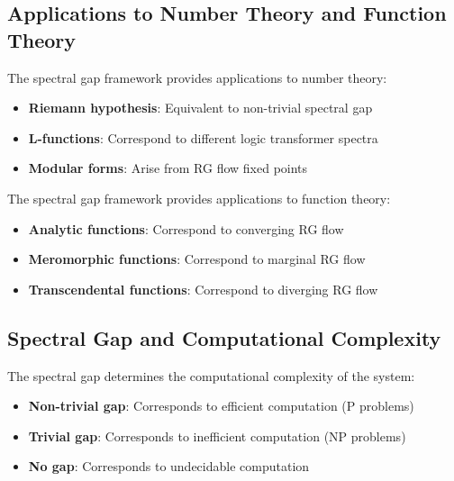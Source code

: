 \subsection{Applications to Number Theory and Function Theory}

\begin{theorem}
\label{thm:number-theory}
The spectral gap framework provides applications to number theory:
\begin{itemize}
\item \textbf{Riemann hypothesis}: Equivalent to non-trivial spectral gap
\item \textbf{L-functions}: Correspond to different logic transformer spectra
\item \textbf{Modular forms}: Arise from RG flow fixed points
\end{itemize}
\end{theorem}

\begin{theorem}
\label{thm:function-theory}
The spectral gap framework provides applications to function theory:
\begin{itemize}
\item \textbf{Analytic functions}: Correspond to converging RG flow
\item \textbf{Meromorphic functions}: Correspond to marginal RG flow
\item \textbf{Transcendental functions}: Correspond to diverging RG flow
\end{itemize}
\end{theorem}

\subsection{Spectral Gap and Computational Complexity}

\begin{theorem}
\label{thm:spectral-complexity}
The spectral gap determines the computational complexity of the system:
\begin{itemize}
\item \textbf{Non-trivial gap}: Corresponds to efficient computation (P problems)
\item \textbf{Trivial gap}: Corresponds to inefficient computation (NP problems)
\item \textbf{No gap}: Corresponds to undecidable computation
\end{itemize}
\end{theorem}

